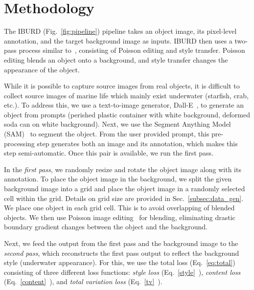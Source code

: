 \section{Methodology}
\label{sec:methods}

The IBURD (Fig.~\ref{fig:pipeline}) pipeline takes an object image, its pixel-level annotation, and the target background image as inputs. IBURD then uses a two-pass process similar to~\cite{zhang_deep_2020}, consisting of Poisson editing and style transfer. Poisson editing blends an object onto a background, and style transfer changes the appearance of the object. 

While it is possible to capture source images from real objects, it is difficult to collect source images of marine life which mainly exist underwater (\eg starfish, crab, etc.). To address this, we use a text-to-image generator, Dall-E~\cite{ramesh2021zero}, to generate an object from prompts (\eg perished plastic container with white background, deformed soda can on white background). Next, we use the Segment Anything Model (SAM)~\cite{kirillov2023segment} to segment the object.
From the user provided prompt, this pre-processing step generates both an image and its annotation, which makes this step semi-automatic. Once this pair is available, we run the first pass.

In the \textit{first pass}, we randomly resize and rotate the object image along with its annotation. 
To place the object image in the background, we split the given background image into a grid and place the object image in a randomly selected cell within the grid. Details on grid size are provided in Sec.~\ref{subsec:data_gen}. We place one object in each grid cell. This is to avoid overlapping of blended objects. 
We then use Poisson image editing~\cite{perez_poisson_2003} for blending, eliminating drastic boundary gradient changes between the object and the background.



Next, we feed the output from the first pass and the background image to the \textit{second pass}, which reconstructs the first pass output to reflect the background style (\ie underwater appearance). For this, we use the total loss (Eq.~\ref{eq:total}) consisting of three different loss functions: \textit{style loss} (Eq.~\ref{style}~\cite{gatys_image_2016, zhang_deep_2020}), \textit{content loss} (Eq.~\ref{content}~\cite{gatys_image_2016, zhang_deep_2020}), and \textit{total variation loss} (Eq.~\ref{tv}~\cite{mahendran_understanding_2015, zhang_deep_2020}). 

